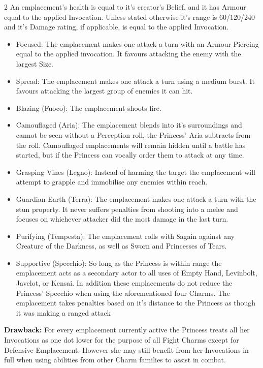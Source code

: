 \begin{multicols}{2}
An emplacement's health is equal to it's creator's Belief, and it has Armour equal to the applied Invocation. Unless stated otherwise it's range is 60/120/240 and it's Damage rating, if applicable, is equal to the applied Invocation. 

 \begin{itemize}
 \item Focused: The emplacement makes one attack a turn with an Armour Piercing equal to the applied invocation. It favours attacking the enemy with the largest Size. 
 \item Spread: The emplacement makes one attack a turn using a medium burst. It favours attacking the largest group of enemies it can hit. 
 \item Blazing (Fuoco): The emplacement shoots fire.
 \item Camouflaged (Aria): The emplacement blends into it's surroundings and cannot be seen without a Perception roll, the Princess' Aria subtracts from the roll. Camouflaged emplacements will remain hidden until a battle has started, but if the Princess can vocally order them to attack at any time. 
 \item Grasping Vines (Legno): Instead of harming the target the emplacement will attempt to grapple and immobilise any enemies within reach. 
 \item Guardian Earth (Terra): The emplacement makes one attack a turn with the stun property. It never suffers penalties from shooting into a melee and focuses on whichever attacker did the most damage in the last turn. 
 \item Purifying (Tempesta): The emplacement rolls with 8again against any Creature of the Darkness, as well as Sworn and Princesses of Tears.
 \item Supportive (Specchio): So long as the Princess is within range the emplacement acts as a secondary actor to all uses of Empty Hand, Levinbolt, Javelot, or Kensai. In addition these emplacements do not reduce the Princess' Specchio when using the aforementioned four Charms. The emplacement takes penalties based on it's distance to the Princess as though it was making a ranged attack
 \end{itemize}
 
 \textbf{Drawback:} For every emplacement currently active the Princess treats all her Invocations as one dot lower for the purpose of all Fight Charms except for Defensive Emplacement. However she may still benefit from her Invocations in full when using abilities from other Charm families to assist in combat. 
 

\end{multicols}
